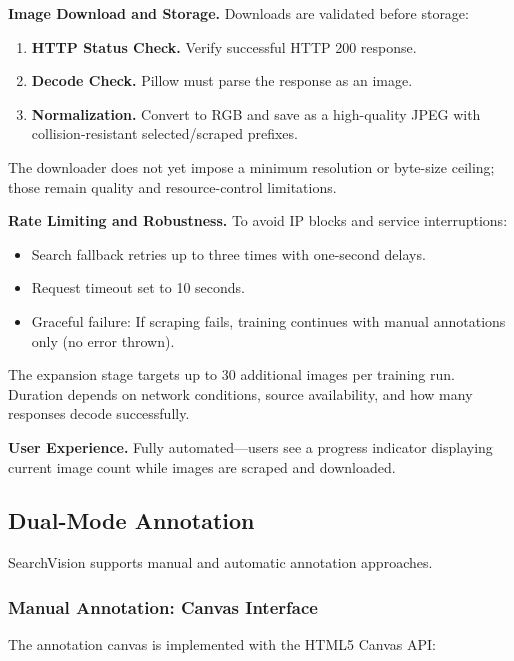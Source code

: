 \documentclass[12pt, letterpaper]{article}
\begin{document}
\textbf{Image Download and Storage.} Downloads are validated before storage:
\begin{enumerate}
  \item \textbf{HTTP Status Check.} Verify successful HTTP 200 response.
  \item \textbf{Decode Check.} Pillow must parse the response as an image.
  \item \textbf{Normalization.} Convert to RGB and save as a high-quality JPEG with
    collision-resistant selected/scraped prefixes.
\end{enumerate}

The downloader does not yet impose a minimum resolution or byte-size ceiling; those remain
quality and resource-control limitations.

\textbf{Rate Limiting and Robustness.} To avoid IP blocks and service interruptions:
\begin{itemize}
  \item Search fallback retries up to three times with one-second delays.
  \item Request timeout set to 10 seconds.
  \item Graceful failure: If scraping fails, training continues with manual annotations only (no error thrown).
\end{itemize}

The expansion stage targets up to 30 additional images per training run. Duration depends
on network conditions, source availability, and how many responses decode successfully.

\textbf{User Experience.} Fully automated---users see a progress indicator displaying current image count 
while images are scraped and downloaded.

\subsection{Dual-Mode Annotation}

SearchVision supports manual and automatic annotation approaches.

\subsubsection{Manual Annotation: Canvas Interface}

The annotation canvas is implemented with the HTML5 Canvas API:
\end{document}
